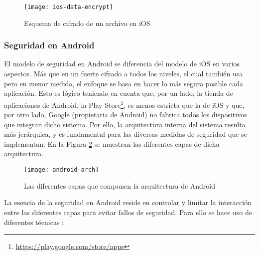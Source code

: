\begin{figure}[H]
	\centering
	\texttt{[image: ios-data-encrypt]}
	\caption{Esquema de cifrado de un archivo en iOS}
	\label{fig:ios-data-encrypt}
\end{figure}


\subsubsection{Seguridad en Android}

El modelo de seguridad en Android se diferencia del modelo de iOS en varios aspectos. Más que en un fuerte cifrado a todos los niveles, el cual también usa pero en menor medida, el enfoque se basa en hacer lo más segura posible cada aplicación. Esto es lógico teniendo en cuenta que, por un lado, la tienda de aplicaciones de Android, la Play Store\footnote{\url{https://play.google.com/store/apps}}, es menos estricta que la de iOS y que, por otro lado, Google (propietaria de Android) no fabrica todos los dispositivos que integran dicho sistema. Por ello, la arquitectura interna del sistema resulta más jerárquica, y es fundamental para las diversas medidas de seguridad que se implementan. En la Figura \ref{fig:android-arch} se muestran las diferentes capas de dicha arquitectura. 

\begin{figure}[H]
	\centering
	\texttt{[image: android-arch]}
	\caption{Las diferentes capas que componen la arquitectura de Android}
	\label{fig:android-arch}
\end{figure}

La esencia de la seguridad en Android reside en controlar y limitar la interacción entre las diferentes capas para evitar fallos de seguridad. Para ello se hace uso de diferentes técnicas \cite{android-sec-guide} \cite{jspdcp-2014}:

